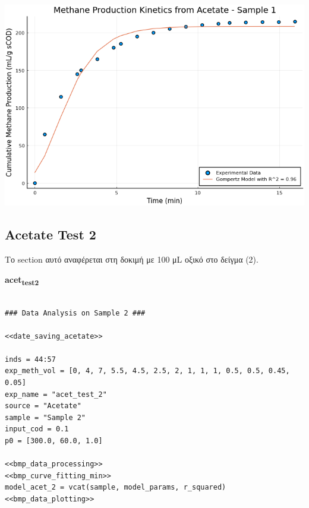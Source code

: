 \documentclass[11pt]{article}
\begin{document}
\begin{center}
\includegraphics[width=.9\linewidth]{../plots/BMPs/Acetate/methane_kinetics_acet_test_1.png}
\end{center}

\subsection{Acetate Test 2}
\label{sec:org6179e81}
Το section αυτό αναφέρεται στη δοκιμή με 100 μL οξικό στο δείγμα (2).

\textbf{acet\textsubscript{test}\textsubscript{2}}
\begin{verbatim}

### Data Analysis on Sample 2 ###

<<date_saving_acetate>>

inds = 44:57
exp_meth_vol = [0, 4, 7, 5.5, 4.5, 2.5, 2, 1, 1, 1, 0.5, 0.5, 0.45, 0.05]
exp_name = "acet_test_2"
source = "Acetate"
sample = "Sample 2"
input_cod = 0.1
p0 = [300.0, 60.0, 1.0]

<<bmp_data_processing>>
<<bmp_curve_fitting_min>>
model_acet_2 = vcat(sample, model_params, r_squared)
<<bmp_data_plotting>>
\end{verbatim}
\end{document}
